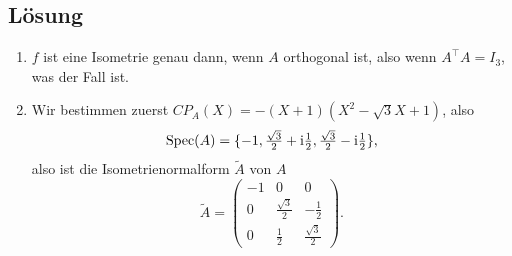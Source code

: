 \subsection{Lösung}
\begin{enumerate}
	\item \( f \) ist eine Isometrie genau dann, wenn \( A \) orthogonal ist, also wenn \( A^\top A = I_3 \), was der Fall ist.
	\item Wir bestimmen zuerst \( CP_A(X) = -(X+1)(X^2-\sqrt{3}X+1) \), also
	\begin{equation*}
		\text{Spec}(A) = \{ -1, \tfrac{\sqrt{3}}{2}+\text{i}\tfrac{1}{2}, \tfrac{\sqrt{3}}{2}-\text{i}\tfrac{1}{2} \}\text{,}
	\end{equation*}
	also ist die Isometrienormalform \( \widetilde{A} \) von \( A \)
	\begin{equation*}
		\widetilde{A} = \begin{pmatrix}
			-1 & 0 & 0 \\
			0 & \tfrac{\sqrt{3}}{2} & -\tfrac{1}{2} \\
			0 & \tfrac{1}{2} & \tfrac{\sqrt{3}}{2}
		\end{pmatrix}\text{.}
	\end{equation*}


\end{enumerate}
